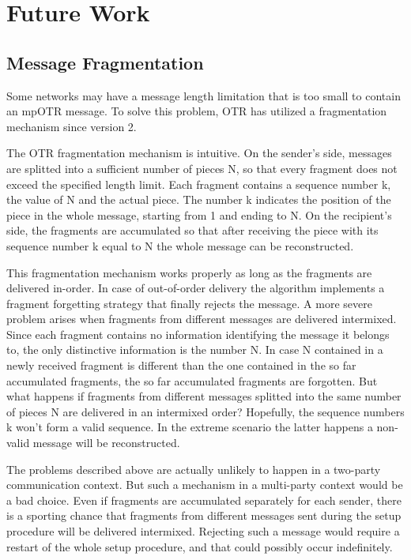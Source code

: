 \chapter{Future Work}
\label{chapters:FutureWork}

\section{Message Fragmentation}
Some networks may have a message length limitation that is too small to contain an mpOTR message. To solve this problem, OTR has utilized a fragmentation mechanism since version 2.

The OTR fragmentation mechanism is intuitive. On the sender's side, messages are splitted into a sufficient number of pieces N, so that every fragment does not exceed the specified length limit. Each fragment contains a sequence number k, the value of N and the actual piece. The number k indicates the position of the piece in the whole message, starting from 1 and ending to N. On the recipient's side, the fragments are accumulated so that after receiving the piece with its sequence number k equal to N the whole message can be reconstructed.

This fragmentation mechanism works properly as long as the fragments are delivered in-order. In case of out-of-order delivery the algorithm implements a fragment forgetting strategy that finally rejects the message. A more severe problem arises when fragments from different messages are delivered intermixed. Since each fragment contains no information identifying the message it belongs to, the only distinctive information is the number N. In case N contained in a newly received fragment is different than the one contained in the so far accumulated fragments, the so far accumulated fragments are forgotten. But what happens if fragments from different messages splitted into the same number of pieces N are delivered in an intermixed order? Hopefully, the sequence numbers k won't form a valid sequence. In the extreme scenario the latter happens a non-valid message will be reconstructed.

The problems described above are actually unlikely to happen in a two-party communication context. But such a mechanism in a multi-party context would be a bad choice. Even if fragments are accumulated separately for each sender, there is a sporting chance that fragments from different messages sent during the setup procedure will be delivered intermixed. Rejecting such a message would require a restart of the whole setup procedure, and that could possibly occur indefinitely.

